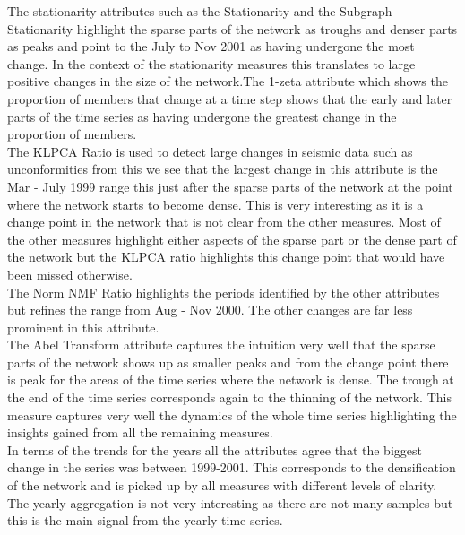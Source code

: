 The stationarity attributes such as the Stationarity and the Subgraph Stationarity highlight the sparse parts of the network as troughs and denser parts as peaks and point to the July to Nov 2001 as having undergone the most change. In the context of the stationarity measures this translates to large positive changes in the size of the network.The 1-zeta attribute which shows the proportion of members that change at a time step shows that the early and later parts of the time series as having undergone the greatest change in the proportion of members. \\

The KLPCA Ratio is used to detect large changes in seismic data such as unconformities from this we see that the largest change in this attribute is the Mar - July 1999 range this just after the sparse parts of the network at the point where the network starts to become dense. This is very interesting as it is a change point in the network that is not clear from the other measures. Most of the other measures highlight either aspects of the sparse part or the dense part of the network but the KLPCA ratio highlights this change point that would have been missed otherwise. \\

The Norm NMF Ratio highlights the periods identified by the other attributes but refines the range from Aug - Nov 2000. The other changes are far less prominent in this attribute. \\

The Abel Transform attribute captures the intuition very well that the sparse parts of the network shows up as smaller peaks and from the change point there is peak for the areas of the time series where the network is dense. The trough at the end of the time series corresponds again to the thinning of the network. This measure captures very well the dynamics of the whole time series highlighting the insights gained from all the remaining measures. \\

In terms of the trends for the years all the attributes agree that the biggest change in the series was between 1999-2001. This corresponds to the densification of the network and is picked up by all measures with different levels of clarity.  The yearly aggregation is not very interesting as there are not many samples but this is the main signal from the yearly time series.\\

